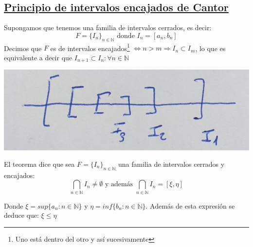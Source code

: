 \documentclass[10pt,a4paper,openright]{book}
\theoremstyle{break}
\begin{document}
\subsection{\underline{Principio de intervalos encajados de Cantor}}
Supongamos que tenemos una familia de intervalos cerrados, es decir:
$$F=\{I_n\}_{n\in \mathbb N}\mbox{ donde }I_n=[a_n,b_n]$$
Decimos que $F$ es de intervalos encajados\footnote{Uno está dentro del otro y así sucesivamente} $\Leftrightarrow n >m \Rightarrow I_n\subset I_m$, lo que es equivalente a decir que $I_{n+1}\subset I_{n}: \forall n\in \mathbb N$\par

\begin{center}
\includegraphics[scale=0.20]{Intervalos encajados}
\end{center}

El teorema dice que sea $F=\{I_n\}_{n\in \mathbb N}$ una familia de intervalos cerrados y encajados:
$$\bigcap_{n\in \mathbb N}I_n\neq \emptyset \mbox{ y además }\bigcap_{n\in \mathbb N} I_n=[\xi, \eta]$$

Donde $\xi=sup\{a_n: n\in \mathbb N\}$ y $\eta=inf\{b_n: n\in \mathbb N\}$. Además de esta expresión se deduce que: $\xi\leq \eta$\par
\vspace{3cm}
\end{document}

